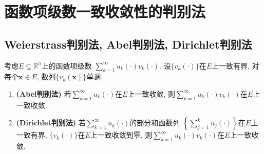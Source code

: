\section{函数项级数一致收敛性的判别法}
\subsection{Weierstrass判别法, Abel判别法, Dirichlet判别法}
\begin{theorem}\label{Th:AD}
考虑\(E\subseteq\mathbb{R}^n\)上的函数项级数
\(\sum_{k=1}^{\infty}u_k(\cdot)v_k(\cdot)\). 
设\(\{v_k(\cdot)\}\)在\(E\)上一致有界, 
对每个\(\boldsymbol{x}\in E\), 数列\(\{v_k(\boldsymbol{x})\}\)单调.
\begin{enumerate}[label=(\roman*)]
\item \textbf{(Abel判别法)} 若\(\sum_{k=1}^{\infty}u_k(\cdot)\)在\(E\)上一致收敛, 
则\(\sum_{k=1}^{\infty}u_k(\cdot)v_k(\cdot)\)在\(E\)上一致收敛.
\item \textbf{(Dirichlet判别法)} 若\(\sum_{k=1}^{\infty}u_k(\cdot)\)的部分和函数列
\(\left\lbrace\sum_{j=1}^{k}u_j(\cdot)\right\rbrace\)在\(E\)上一致有界, 
\(\{v_k(\cdot)\}\)在\(E\)上一致收敛到零, 
则\(\sum_{k=1}^{\infty}u_k(\cdot)v_k(\cdot)\)在\(E\)上一致收敛.
\end{enumerate}
\end{theorem}
